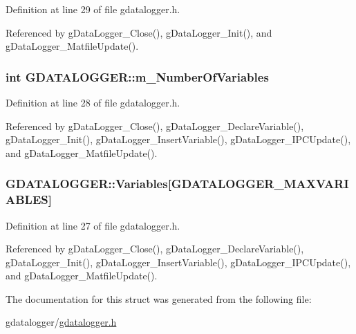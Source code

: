 Definition at line 29 of file gdatalogger.h.



Referenced by gDataLogger\_\-Close(), gDataLogger\_\-Init(), and gDataLogger\_\-MatfileUpdate().

\hypertarget{structGDATALOGGER_a2ac727ee6c50f7e04030cbe531158f08}{
\subsubsection[{m\_\-NumberOfVariables}]{\setlength{\rightskip}{0pt plus 5cm}int {\bf GDATALOGGER::m\_\-NumberOfVariables}}}
\label{structGDATALOGGER_a2ac727ee6c50f7e04030cbe531158f08}


Definition at line 28 of file gdatalogger.h.



Referenced by gDataLogger\_\-Close(), gDataLogger\_\-DeclareVariable(), gDataLogger\_\-Init(), gDataLogger\_\-InsertVariable(), gDataLogger\_\-IPCUpdate(), and gDataLogger\_\-MatfileUpdate().

\hypertarget{structGDATALOGGER_a6af9584d8665205b950cb2dcc5f90a94}{
\subsubsection[{Variables}]{ {\bf GDATALOGGER::Variables}\mbox{[}GDATALOGGER\_\-MAXVARIABLES\mbox{]}}}
\label{structGDATALOGGER_a6af9584d8665205b950cb2dcc5f90a94}


Definition at line 27 of file gdatalogger.h.



Referenced by gDataLogger\_\-Close(), gDataLogger\_\-DeclareVariable(), gDataLogger\_\-Init(), gDataLogger\_\-InsertVariable(), gDataLogger\_\-IPCUpdate(), and gDataLogger\_\-MatfileUpdate().



The documentation for this struct was generated from the following file:\begin{DoxyCompactItemize}
\item 
gdatalogger/\hyperlink{gdatalogger_8h}{gdatalogger.h}\end{DoxyCompactItemize}
